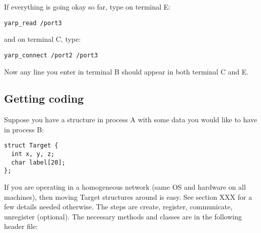 If everything is going okay so far, type on terminal E:
%
\begin{verbatim}
yarp_read /port3
\end{verbatim}
%
and on terminal C, type:
%
\begin{verbatim}
yarp_connect /port2 /port3
\end{verbatim}
%
Now any line you enter in terminal B should appear in both terminal C and E.



\subsection{Getting coding}

Suppose you have a structure  in process A with some data
you would like to have in process B:
%
\begin{verbatim}
struct Target {
  int x, y, z;
  char label[20];
};
\end{verbatim}
%
If you are operating in a homogeneous network (same OS and hardware on
all machines), then moving Target structures around is easy.  See
section XXX for a few details needed otherwise.
%
The steps are create, register, communicate, unregister (optional).
The necessary methods and classes are in the following header file:

